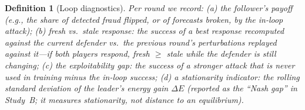 \documentclass[conference]{IEEEtran}
\newtheorem{definition}{Definition}
\begin{document}
\begin{definition}[Loop diagnostics]\label{def:diag}
Per round we record: (a) the \emph{follower's payoff} (e.g., the share of detected fraud flipped, or of forecasts broken, by the in-loop attack); (b) \emph{fresh} vs.\ \emph{stale} response: the success of a best response recomputed against the current defender vs.\ the previous round's perturbations replayed against it---if both players respond, fresh $\geq$ stale while the defender is still changing; (c) the \emph{exploitability gap}: the success of a stronger attack that is never used in training minus the in-loop success; (d) a \emph{stationarity indicator}: the rolling standard deviation of the leader's energy gain $\Delta E$ (reported as the ``Nash gap'' in Study~B; it measures stationarity, not distance to an equilibrium).
\end{definition}
\end{document}
